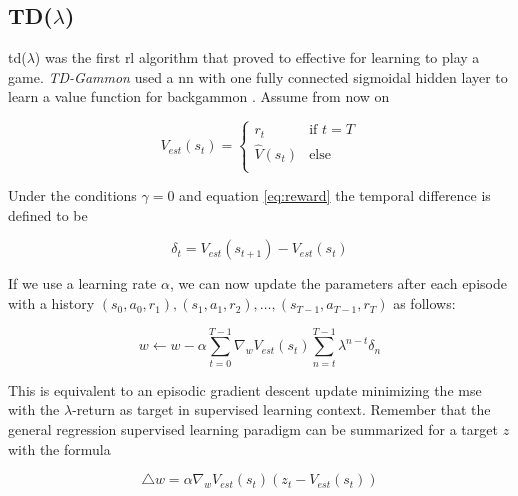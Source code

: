 \subsection{TD($\lambda$)}
\label{subsec:tdy}
\gls{td}($\lambda$) was the first \gls{rl} algorithm that proved to effective for learning to play a game. \textit{TD-Gammon} used a \acrlong{nn} with one fully connected sigmoidal hidden layer to learn a value function for backgammon \cite{tdgammon95}. Assume from now on  

\begin{equation}
V_{est}(s_t)=\begin{cases} 
   r_t &  \text{if } t=T \\
   \hat{V}(s_t) & \text{else} \\
  \end{cases}
\end{equation}

Under the conditions $\gamma=0$ and equation \ref{eq:reward} the temporal difference is defined to be

\begin{equation}
\label{eq:td}
\delta_t=V_{est}(s_{t+1})-V_{est}(s_{t})
\end{equation}

If we use a learning rate $\alpha$, we can now update the parameters after each episode with a history $(s_0,a_0,r_1),(s_1,a_1,r_2), \dotso , (s_{T-1},a_{T-1},r_T)$ as follows:

\begin{equation}
\label{eq:update}
w \leftarrow w-\alpha \sum_{t=0}^{T-1} \nabla_w V_{est}(s_t) \sum_{n=t}^{T-1} \lambda^{n-t}\delta_n
\end{equation}

This is equivalent to an episodic gradient descent update minimizing the \gls{mse} with the $\lambda$-return as target in supervised learning context. Remember that the general regression supervised learning paradigm can be summarized for a target $z$ with the formula

\begin{equation}
\bigtriangleup w =\alpha \nabla_w V_{est}(s_t) (z_t-V_{est}(s_t))
\end{equation}

